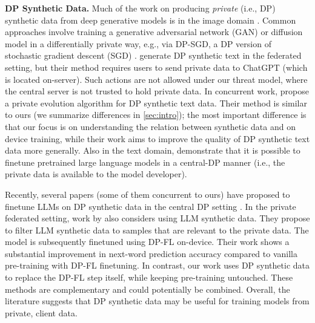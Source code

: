 \textbf{DP Synthetic Data.} Much of the work on producing \emph{private} (i.e., DP) synthetic data from deep generative models is in the image domain \citep{lin2021privacy, cao2021don,dockhorn2022differentially,chen2022fedtune}. 
Common approaches involve training a generative adversarial network (GAN) or diffusion model in a differentially private way, e.g., via DP-SGD, a DP version of stochastic gradient descent (SGD) \citep{abadi2016deep}.  \citet{tang2023privacy} generate DP synthetic text in the federated setting, but their method requires users to send private data to ChatGPT (which is located on-server).  
Such actions are not allowed under our threat model, where the central server is not trusted to hold private data. 
In concurrent work, \citep{xie2024differentially} propose a  private evolution algorithm for DP synthetic text data. Their method is similar to ours (we summarize differences in \cref{sec:intro}); the most important difference is that our focus is on understanding the relation between synthetic data and on device training, while their work aims to improve the quality of DP synthetic text data more generally.
Also in the text domain, \citep{li2021large, yu2021differentially} demonstrate that it is possible to finetune pretrained large language models in a central-DP manner (i.e., the private data is available to the model developer).

Recently, %
several papers (some of them concurrent to ours) have proposed to finetune LLMs on DP synthetic data in the central DP setting \citep{yue2022synthetic, kurakin2023harnessing,yu2024privacy, ding2024delving}. 
In the private federated setting, work by \citet{wang2023can, wu2024prompt}
 also considers using LLM synthetic data. They propose to filter LLM synthetic data to samples that are relevant to the private data. The model is subsequently finetuned using DP-FL on-device. 
Their work shows a substantial improvement in next-word prediction accuracy compared to vanilla pre-training with DP-FL finetuning. In contrast, our work uses DP synthetic data to replace the DP-FL step itself, while keeping pre-training untouched. These methods are complementary and could potentially be combined.
Overall, the literature suggests that DP synthetic data may be useful for training models from private, client data.


